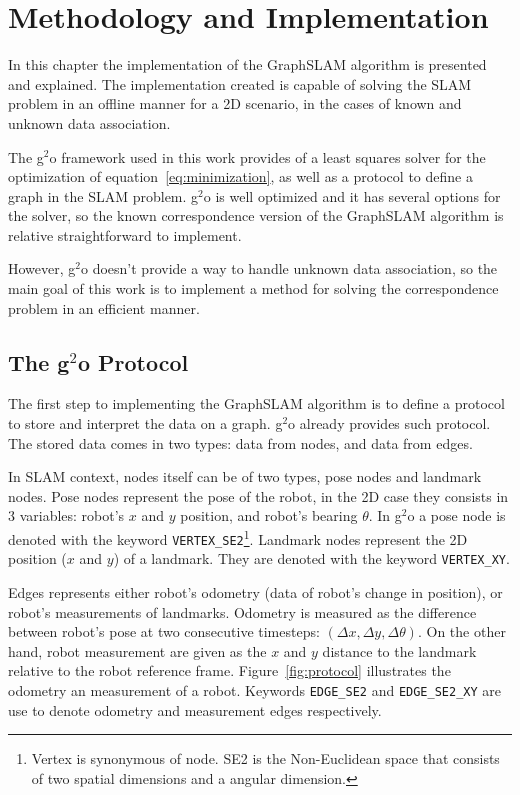 \chapter{Methodology and Implementation}
\label{chap:implementation}
 
In this chapter the implementation of the GraphSLAM algorithm is presented and explained. The implementation created is capable of solving the SLAM problem in an offline manner for a 2D scenario, in the cases of known and unknown data association.

The g$^2$o framework used in this work provides of a least squares solver for the optimization of equation~\eqref{eq:minimization}, as well as a protocol to define a graph in the SLAM problem. g$^2$o is well optimized and it has several options for the solver, so the known correspondence version of the GraphSLAM algorithm is relative straightforward to implement.

However, g$^2$o doesn't provide a way to handle unknown data association, so the main goal of this work is to implement a method for solving the correspondence problem in an efficient manner.

\section{The g$^2$o Protocol}

The first step to implementing the GraphSLAM algorithm is to define a protocol to store and interpret the data on a graph. g$^2$o already provides such protocol. The stored data comes in two types: data from nodes, and data from edges. 

In SLAM context, nodes itself can be of two types, pose nodes and landmark nodes. Pose nodes represent the pose of the robot, in the 2D case they consists in 3 variables: robot's $x$ and $y$ position, and robot's bearing $\theta$. In g$^2$o a pose node is denoted with the keyword \texttt{VERTEX\_SE2}\footnote{Vertex is synonymous of node. SE2 is the Non-Euclidean space that consists of two spatial dimensions and a angular dimension.}. Landmark nodes represent the 2D position ($x$ and $y$) of a landmark. They are denoted with the keyword \texttt{VERTEX\_XY}.

Edges represents either robot's odometry (data of robot's change in position), or robot's measurements of landmarks. Odometry is measured as the difference between robot's pose at two consecutive timesteps: $(\Delta x, \Delta y, \Delta \theta)$. On the other hand, robot measurement are given as the $x$ and $y$ distance to the landmark relative to the robot reference frame. Figure~\ref{fig:protocol} illustrates the odometry an measurement of a robot. Keywords \texttt{EDGE\_SE2} and \texttt{EDGE\_SE2\_XY} are use to denote odometry and measurement edges respectively.

